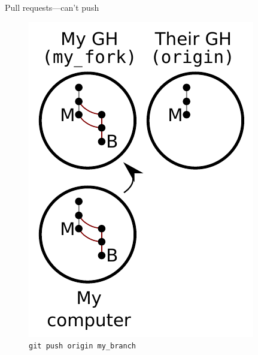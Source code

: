 \begin{frame}{Pull requests---can't push}
  \begin{figure}
    \includegraphics{fork_012.pdf}
    \\ \texttt{git push origin my\_branch}
    \\ \texttt{}
  \end{figure}
\end{frame}


